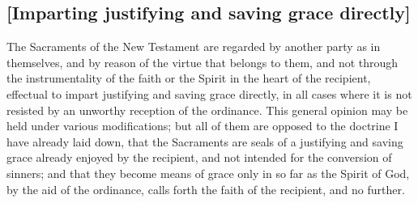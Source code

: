 \documentclass[
]{book}
\begin{document}
\hypertarget{imparting-justifying-and-saving-grace-directly}{%
\subsection{{[}Imparting justifying and saving grace directly{]}}\label{imparting-justifying-and-saving-grace-directly}}

The Sacraments of the New Testament are regarded by another party as in themselves, and by reason of the virtue that belongs to them, and not through the instrumentality of the faith or the Spirit in the heart of the recipient, effectual to impart justifying and saving grace directly, in all cases where it is not resisted by an unworthy reception of the ordinance. This general opinion may be held under various modifications; but all of them are opposed to the doctrine I have already laid down, that the Sacraments are seals of a justifying and saving grace already enjoyed by the recipient, and not intended for the conversion of sinners; and that they become means of grace only in so far as the Spirit of God, by the aid of the ordinance, calls forth the faith of the recipient, and no further.
\end{document}
